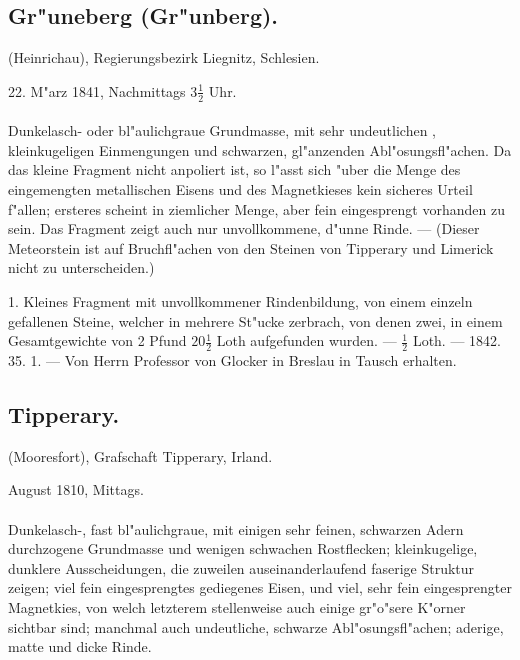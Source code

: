 \documentclass[a4paper, 11pt, oneside, polutonikogreek, german]{article}
\begin{document}
\subsection{Gr"uneberg (Gr"unberg).}
\begin{center}
\small
(Heinrichau), Regierungsbezirk Liegnitz, Schlesien.

22. M"arz 1841, Nachmittags $3\frac{1}{2}$ Uhr.
\end{center}
\paragraph{}
Dunkelasch- oder bl"aulichgraue Grundmasse, mit sehr undeutlichen , kleinkugeligen Einmengungen und schwarzen, gl"anzenden Abl"osungsfl"achen. Da das kleine Fragment nicht anpoliert ist, so l"asst sich "uber die Menge des eingemengten metallischen Eisens und des Magnetkieses kein sicheres Urteil f"allen; ersteres scheint in ziemlicher Menge, aber fein eingesprengt vorhanden zu sein. Das Fragment zeigt auch nur unvollkommene, d"unne Rinde. --- (Dieser Meteorstein ist auf Bruchfl"achen von den Steinen von Tipperary und Limerick nicht zu unterscheiden.)

1. Kleines Fragment mit unvollkommener Rindenbildung, von einem einzeln gefallenen Steine, welcher in mehrere St"ucke zerbrach, von denen zwei, in einem Gesamtgewichte von 2 Pfund $20\frac{1}{2}$ Loth aufgefunden wurden. --- $\frac{1}{2}$ Loth. --- 1842. 35. 1. --- Von Herrn Professor von Glocker in Breslau in Tausch erhalten.
\subsection{Tipperary.}
\begin{center}
\small
(Mooresfort), Grafschaft Tipperary, Irland.

August 1810, Mittags.
\end{center}
\paragraph{}
Dunkelasch-, fast bl"aulichgraue, mit einigen sehr feinen, schwarzen Adern durchzogene Grundmasse und wenigen schwachen Rostflecken; kleinkugelige, dunklere Ausscheidungen, die zuweilen auseinanderlaufend faserige Struktur zeigen; viel fein eingesprengtes gediegenes Eisen, und viel, sehr fein eingesprengter Magnetkies, von welch letzterem stellenweise auch einige gr"o"sere K"orner sichtbar sind; manchmal auch undeutliche, schwarze Abl"osungsfl"achen; aderige, matte und dicke Rinde.
\end{document}
